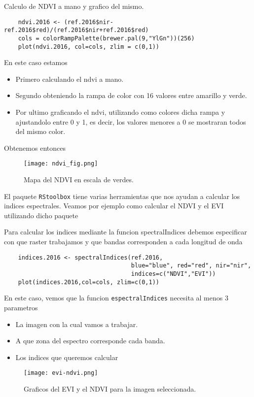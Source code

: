 \begin{exa}
    Calculo de NDVI a mano y grafico del mismo.
    \begin{lstlisting}
    ndvi.2016 <- (ref.2016$nir-ref.2016$red)/(ref.2016$nir+ref.2016$red)
    cols = colorRampPalette(brewer.pal(9,"YlGn"))(256)
    plot(ndvi.2016, col=cols, zlim = c(0,1))
    \end{lstlisting}
    En este caso estamos
    \begin{itemize}
        \item Primero calculando el ndvi a mano.
        \item Segundo obteniendo la rampa de color con 16 valores entre amarillo
            y verde.
        \item Por ultimo graficando el ndvi, utilizando como colores dicha rampa
            y ajustandolo entre 0 y 1, es decir, los valores menores a 0 se
            mostraran todos del mismo color.
    \end{itemize}
    Obtenemos entonces
    \begin{figure}[h!]
    \begin{center}
        \texttt{[image: ndvi\_fig.png]}
    \end{center}
    \caption{Mapa del NDVI en escala de verdes.}
    \label{fig:ndvifig}
    \end{figure}

\end{exa}

El paquete \texttt{RStoolbox} tiene varias herramientas que nos ayudan a
calcular los indices espectrales. Veamos por ejemplo como calcular el NDVI y el
EVI utilizando dicho paquete

\begin{exa}
    Para calcular los indices mediante la funcion spectralIndices debemos
    especificar con que raster trabajamos y que bandas corresponden a cada
    longitud de onda
    \begin{lstlisting}
    indices.2016 <- spectralIndices(ref.2016,
                                    blue="blue", red="red", nir="nir",
                                    indices=c("NDVI","EVI"))
    plot(indices.2016,col=cols, zlim=c(0,1))
    \end{lstlisting}
    En este caso, vemos que la funcion \texttt{espectralIndices} necesita al
    menos 3 parametros
    \begin{itemize}
        \item La imagen con la cual vamos a trabajar.
        \item A que zona del espectro corresponde cada banda.
        \item Los indices que queremos calcular
    \end{itemize}
     \begin{figure}[h!]
     \begin{center}
         \texttt{[image: evi-ndvi.png]}
     \end{center}
     \caption{Graficos del EVI y el NDVI para la imagen seleccionada.}
     \label{fig:evi-ndvi}
     \end{figure}

\end{exa}

